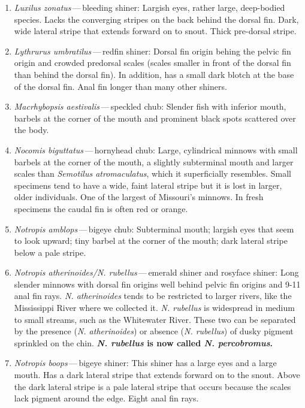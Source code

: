 \documentclass[11pt, hidelinks]{exam}
\begin{document}
\begin{enumerate}
\item \textit{Luxilus zonatus}\,—\,bleeding shiner: Largish eyes, rather large, deep-bodied species. Lacks the converging stripes on the back behind the dorsal fin. Dark, wide lateral stripe that extends forward on to snout. Thick pre-dorsal stripe.

\item \textit{Lythrurus umbratilus}\,—\,redfin shiner:  Dorsal fin origin behing the pelvic fin origin and crowded predorsal scales (scales smaller in front of the dorsal fin than behind the dorsal fin).  In addition, has a small dark blotch at the base of the dorsal fin. Anal fin longer than many other shiners.

\item \textit{Macrhybopsis aestivalis}\,—\,speckled chub: Slender fish with inferior mouth, barbels at the corner of the mouth and prominent black spots scattered over the body.

\item \textit{Nocomis biguttatus}\,—\,hornyhead chub: Large, cylindrical minnows with small barbels at the corner of the mouth, a slightly subterminal mouth and larger scales than \textit{Semotilus atromaculatus}, which it superficially resembles. Small specimens tend to have a wide, faint lateral stripe but it is lost in larger, older individuals.  One of the largest of Missouri’s minnows. In fresh specimens the caudal fin is often red or orange.

\item \textit{Notropis amblops}\,—\,bigeye chub: Subterminal mouth; largish eyes that seem to look upward; tiny barbel at the corner of the mouth; dark lateral stripe below a pale stripe.

\item \textit{Notropis atherinoides/N. rubellus}\,—\,emerald shiner and rosyface shiner: Long slender minnows with dorsal fin origins well behind pelvic fin origins and 9-11 anal fin rays. \textit{N. atherinoides} tends to be restricted to larger rivers, like the Mississippi River where we collected it. 
\textit{N. rubellus} is widespread in medium to small streams, such as the Whitewater River.  These two can be separated by the presence (\textit{N. atherinoides}) or absence (\textit{N. rubellus}) of dusky pigment sprinkled on the chin. \textbf{\textit{N. rubellus} is now called \textit{N. percobromus}.}

\item \textit{Notropis boops}\,—\,bigeye shiner: This shiner has a large eyes and a large mouth. Has a dark lateral stripe that extends forward on to the snout. Above the dark lateral stripe is a pale lateral stripe that occurs because the scales lack pigment around the edge. Eight anal fin rays.


\end{enumerate}
\end{document}
